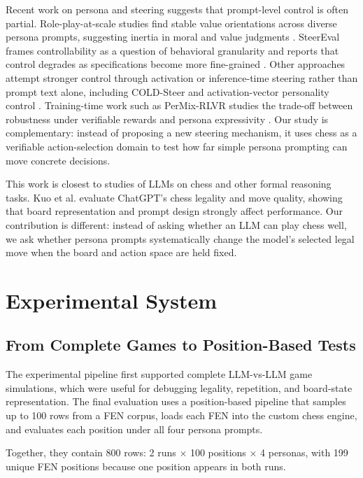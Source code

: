 \documentclass[10pt]{article}
\begin{document}
Recent work on persona and steering suggests that prompt-level control is often partial. Role-play-at-scale studies find stable value orientations across diverse persona prompts, suggesting inertia in moral and value judgments \citep{lee2024stable}. SteerEval frames controllability as a question of behavioral granularity and reports that control degrades as specifications become more fine-grained \citep{xu2026steereval}. Other approaches attempt stronger control through activation or inference-time steering rather than prompt text alone, including COLD-Steer \citep{sharma2026coldsteer} and activation-vector personality control \citep{feng2026persona}. Training-time work such as PerMix-RLVR studies the trade-off between robustness under verifiable rewards and persona expressivity \citep{oh2026permix}. Our study is complementary: instead of proposing a new steering mechanism, it uses chess as a verifiable action-selection domain to test how far simple persona prompting can move concrete decisions.

This work is closest to studies of LLMs on chess and other formal reasoning tasks. Kuo et al. \citep{kuo2023chessboard} evaluate ChatGPT's chess legality and move quality, showing that board representation and prompt design strongly affect performance. Our contribution is different: instead of asking whether an LLM can play chess well, we ask whether persona prompts systematically change the model's selected legal move when the board and action space are held fixed.

\section{Experimental System}

\subsection{From Complete Games to Position-Based Tests}

The experimental pipeline first supported complete LLM-vs-LLM game simulations, which were useful for debugging legality, repetition, and board-state representation. The final evaluation uses a position-based pipeline that samples up to 100 rows from a FEN corpus, loads each FEN into the custom chess engine, and evaluates each position under all four persona prompts.

Together, they contain 800 rows: 2 runs $\times$ 100 positions $\times$ 4 personas, with 199 unique FEN positions because one position appears in both runs.
\end{document}

